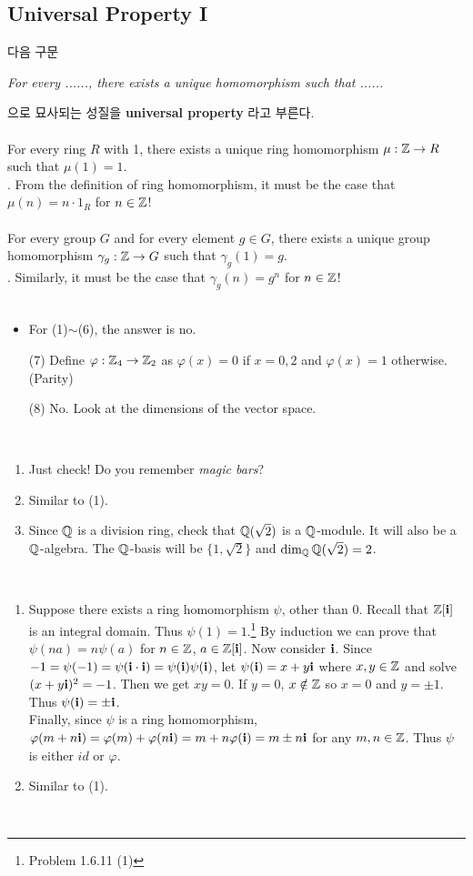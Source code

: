 \subsection{Universal Property I}
 다음 구문
\begin{center}
	\textit{For every ......, there exists a unique homomorphism such that ......}
\end{center}
으로 묘사되는 성질을 \textbf{universal property} 라고 부른다.\\
\\
 For every ring $R$ with 1, there exists a unique ring homomorphism $\mu:\mathbb{Z}\rightarrow R$ such that $\mu(1)=1$.\\
\pf. From the definition of ring homomorphism, it must be the case that $\mu(n) = n\cdot 1_R$ for $n\in \mathbb{Z}$!\\
\\
 For every group $G$ and for every element $g\in G$, there exists a unique group homomorphism $\gamma_g:\mathbb{Z}\rightarrow G$ such that $\gamma_g(1) = g$.\\
\pf. Similarly, it must be the case that $\gamma_g(n) = g^n$ for $n\in \mathbb{Z}$!\\
\\
\begin{itemize}
	\item For (1)$\sim$(6), the answer is no.
	\item[(7)] Define $\varphi:\mathbb{Z}_4\rightarrow \mathbb{Z}_2$ as $\varphi(x) = 0$ if $x = 0, 2$ and $\varphi(x) = 1$ otherwise. (Parity)
	\item[(8)] No. Look at the dimensions of the vector space.
\end{itemize}~
\\
\begin{enumerate}
	\item Just check! Do you remember \textit{magic bars}?
	\item Similar to (1).
	\item Since $\mathbb{Q}$ is a division ring, check that $\mathbb{Q}(\sqrt{2})$ is a $\mathbb{Q}$-module. It will also be a $\mathbb{Q}$-algebra. The $\mathbb{Q}$-basis will be $\{1, \sqrt{2}\}$ and $\dim_{\mathbb{Q}} \mathbb{Q}(\sqrt{2}) = 2$.
\end{enumerate}~
\\
\begin{enumerate}
	\item Suppose there exists a ring homomorphism $\psi$, other than $0$. Recall that $\mathbb{Z}[\mathrm{\mathbf{i}}]$ is an integral domain. Thus $\psi(1) = 1$.\footnote{Problem 1.6.11 (1)} By induction we can prove that $\psi(na) = n\psi(a)$ for $n\in \mathbb{Z}$, $a\in \mathbb{Z}[\mathrm{\mathbf{i}}]$. Now consider $\mathrm{\mathbf{i}}$. Since $-1=\psi(-1) = \psi(\mathrm{\mathbf{i}}\cdot \mathrm{\mathbf{i}}) = \psi(\mathrm{\mathbf{i}})\psi(\mathrm{\mathbf{i}})$, let $\psi(\mathrm{\mathbf{i}}) = x + y\mathrm{\mathbf{i}}$ where $x, y\in \mathbb{Z}$ and solve $(x+y\mathrm{\mathbf{i}})^2 = -1$. Then we get $xy = 0$. If $y = 0$, $x\notin\mathbb{Z}$ so $x = 0$ and $y = \pm 1$. Thus $\psi(\mathrm{\mathbf{i}}) = \pm \mathrm{\mathbf{i}}$.\\
	Finally, since $\psi$ is a ring homomorphism, $\varphi(m + n\mathrm{\mathbf{i}}) = \varphi(m) + \varphi(n\mathrm{\mathbf{i}}) = m + n\varphi(\mathrm{\mathbf{i}}) = m \pm n\mathrm{\mathbf{i}}$ for any $m, n\in \mathbb{Z}$. Thus $\psi$ is either $id$ or $\varphi$.
	\item Similar to (1). 
\end{enumerate}~
